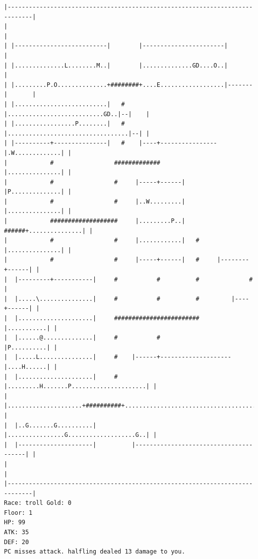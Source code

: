 \documentclass[11pt]{article}
\theoremstyle{plain}
\begin{document}
\begin{Verbatim}[fontsize=\scriptsize]
|-----------------------------------------------------------------------------|
|                                                                             |
| |--------------------------|        |-----------------------|               |
| |..............L........M..|        |..............GD....O..|               |
| |.........P.O..............+########+....E..................|-------|       |
| |..........................|   #    |...........................GD..|--|    |
| |.................P........|   #    |..................................|--| |
| |----------+---------------|   #    |----+----------------|.W.............| |
|            #                 #############                |...............| |
|            #                 #     |-----+------|         |P..............| |
|            #                 #     |..W.........|         |...............| |
|            ###################     |.........P..|   ######+...............| |
|            #                 #     |............|   #     |...............| |
|            #                 #     |-----+------|   #     |--------+------| |
|  |---------+-----------|     #           #          #              #        |
|  |.....\...............|     #           #          #         |----+------| |
|  |.....................|     ########################         |...........| |
|  |......@..............|     #           #                    |P..........| |
|  |.....L...............|     #    |------+--------------------|....H......| |
|  |.....................|     #    |.........H.......P.....................| |
|  |.....................+##########+.......................................| |
|  |..G.......G..........|          |................G...................G..| |
|  |---------------------|          |---------------------------------------| |
|                                                                             |
|-----------------------------------------------------------------------------|
Race: troll Gold: 0                                                    Floor: 1
HP: 99
ATK: 35
DEF: 20
PC misses attack. halfling dealed 13 damage to you. 
\end{Verbatim}
\newpage
\end{document}

